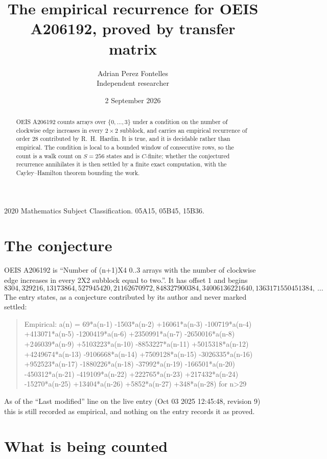 \documentclass[11pt,a4paper]{article}
\title{The empirical recurrence for OEIS A206192, proved by transfer matrix}
\author{Adrian Perez Fontelles\\ \small Independent researcher}
\date{2 September 2026}
\theoremstyle{plain}
\theoremstyle{definition}
\begin{document}
\maketitle

\begin{abstract}
OEIS A206192 counts arrays over $\{0,\dots,3\}$ under a condition on the number of clockwise edge increases
in every $2\times2$ subblock, and carries an empirical recurrence of order $28$ contributed by
R.~H.~Hardin. It is true, and it is decidable rather than empirical. The condition is local to
a bounded window of consecutive rows, so the count is a walk count on $S=256$ states and is
$C$-finite; whether the conjectured recurrence annihilates it is then settled by a finite exact
computation, with the Cayley--Hamilton theorem bounding the work.
\end{abstract}

\noindent\small 2020 Mathematics Subject Classification. 05A15, 05B45, 15B36.\normalsize

\section{The conjecture}

OEIS A206192 is ``Number of (n+1)X4 0..3 arrays with the number of clockwise edge increases in every 2X2 subblock equal to two.''. It has offset $1$ and begins
\[
8304, 329216, 13173864, 527945420, 21162670972, 848327900384, 34006136221640, 1363171550451384,\ \dots
\]
The entry states, as a conjecture contributed by its author and never marked settled:
\begin{quote}
Empirical: a(n) = 69*a(n-1) -1503*a(n-2) +16061*a(n-3) -100719*a(n-4) +413071*a(n-5) -1200419*a(n-6) +2350991*a(n-7) -2650016*a(n-8) +246039*a(n-9) +5103223*a(n-10) -8853227*a(n-11) +5015318*a(n-12) +4249674*a(n-13) -9106668*a(n-14) +7509128*a(n-15) -3026335*a(n-16) +952523*a(n-17) -1880226*a(n-18) -37992*a(n-19) -166501*a(n-20) -450312*a(n-21) -419109*a(n-22) +222765*a(n-23) +217432*a(n-24) -15270*a(n-25) +13404*a(n-26) +5852*a(n-27) +348*a(n-28) for n>29
\end{quote}
As of the ``Last modified'' line on the live entry (Oct 03 2025 12:45:48, revision 9) this is still
recorded as empirical, and nothing on the entry records it as proved.

\section{What is being counted}
\end{document}
